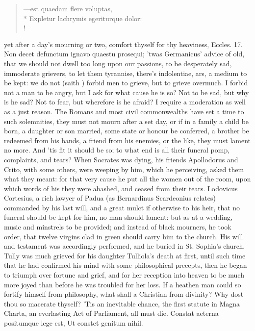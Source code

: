 {\begin{latin}%
\begin{verse}%
---est quaedam flere voluptas,\\*
Expletur lachrymis egeriturque dolor:\\!
\end{verse}%
\end{latin}%
%
yet after a day's mourning or two, comfort thyself for thy heaviness,
Eccles.  17. Non decet defunctum ignavo quaestu prosequi;
'twas Germanicus' advice of old, that we should not dwell too long upon
our passions, to be desperately sad, immoderate grievers, to let them
tyrannise, there's indolentiae, ars, a medium to be kept: we do not
(saith \Austin{}) forbid men to grieve, but to grieve overmuch. I
forbid not a man to be angry, but I ask for what cause he is so? Not to
be sad, but why is he sad? Not to fear, but wherefore is he afraid? I
require a moderation as well as a just reason. The Romans and
most civil commonwealths have set a time to such solemnities, they must
not mourn after a set day, or if in a family a child be born, a
daughter or son married, some state or honour be conferred, a brother
be redeemed from his bands, a friend from his enemies, or the like,
they must lament no more. And 'tis fit it should be so; to what end is
all their funeral pomp, complaints, and tears? When Socrates was dying,
his friends Apollodorus and Crito, with some others, were weeping by
him, which he perceiving, asked them what they meant: for that
very cause he put all the women out of the room, upon which words of
his they were abashed, and ceased from their tears. Lodovicus
Cortesius, a rich lawyer of Padua (as  Bernardinus Scardeonius
relates) commanded by his last will, and a great mulct if otherwise to
his heir, that no funeral should be kept for him, no man should lament:
but as at a wedding, music and minstrels to be provided; and instead of
black mourners, he took order, that twelve virgins clad in green
should carry him to the church. His will and testament was accordingly
performed, and he buried in St. Sophia's church. Tully was much
grieved for his daughter Tulliola's death at first, until such time
that he had confirmed his mind with some philosophical precepts,
then he began to triumph over fortune and grief, and for her
reception into heaven to be much more joyed than before he was troubled
for her loss. If a heathen man could so fortify himself from
philosophy, what shall a Christian from divinity? Why dost thou so
macerate thyself? 'Tis an inevitable chance, the first statute in Magna
Charta, an everlasting Act of Parliament, all must die.
Constat aeterna positumque lege est,
Ut constet genitum nihil.

}
